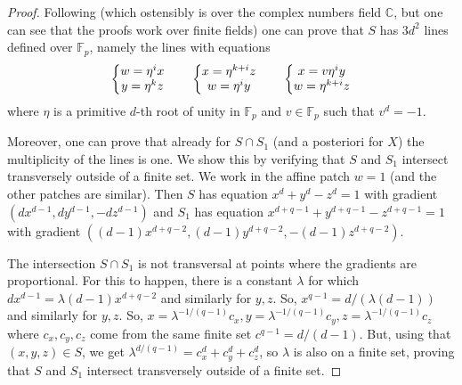 \documentclass[12pt]{amsart}
\theoremstyle{definition}
\begin{document}
\begin{proof}
Following \cite{ARM} (which ostensibly is over the complex numbers field $\mathbb C$, but one can see that the proofs work over finite fields) one can prove that  $S$ has $3d^2$ lines defined over ${\mathbb F}_p$, namely the lines with equations
\begin{equation*}
\left\{
\begin{matrix}
w = \eta^i x   \\
y = \eta^kz \cr
\end{matrix}
\right.
\qquad
\left\{
\begin{matrix}
x = \eta^{k+i} z   \\
w = \eta^iy\cr
\end{matrix}
\right. 
\qquad
\left\{
\begin{matrix}
x = v\eta^i y   \\
w = \eta^{k+i}z \cr
\end{matrix}
\right. 
\end{equation*}
where $\eta$ is a primitive $d$-th root of unity in ${\mathbb F}_p$ and $v\in {\mathbb F}_p$ such that $v^d=-1$.

Moreover, one can prove that already for $S\cap S_1$ (and a posteriori for $X$) the multiplicity of the lines is one. We show this by verifying that $S$ and $S_1$ intersect transversely outside of a finite set. We work in the affine patch $w=1$ (and the other patches are similar). Then $S$ has equation $x^d +y^d - z^d =1$ with gradient $(dx^{d-1}, dy^{d-1},-dz^{d-1})$ and 
$S_1$ has equation $x^{d+q-1} +y^{d+q-1} - z^{d+q-1} =1$ with gradient $((d-1)x^{d+q-2}, (d-1)y^{d+q-2},-(d-1)z^{d+q-2})$.

The intersection $S\cap S_1$ is not transversal at points where the gradients are proportional. For this to happen, there is a constant $\lambda$ for which $dx^{d-1} = \lambda (d-1)x^{d+q-2}$ and similarly for $y,z$. So, $x^{q-1} = d/(\lambda (d-1))$ and similarly for $y,z$. So, $x= \lambda^{-1/(q-1)}c_x, y= \lambda^{-1/(q-1)}c_y, z= \lambda^{-1/(q-1)}c_z$ where $c_x,c_y,c_z$ come from the same finite set $c^{q-1} = d/(d-1)$. But, using that $(x,y,z) \in S$,  we get 
$\lambda^{d/(q-1)} = c_x^d+c_y^d+c_z^d$, so $\lambda$ is also on a finite set, proving that $S$ and $S_1$ intersect transversely outside of a finite set.
\end{proof}





\end{document}
